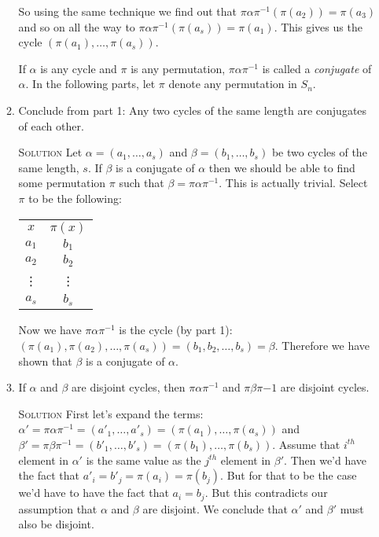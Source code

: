 \documentclass[twoside]{amsart}
\newcommand{\solution}{\textsc{Solution}\xspace}
\begin{document}
\begin{enumerate}[A.]
\begin{enumerate}[1]
       So using the same technique we find out that 
       $\pi \alpha \pi^{-1}(\pi(a_2))=\pi(a_3)$ and so on all the way
       to $\pi \alpha \pi^{-1}(\pi(a_s))=\pi(a_1)$. This gives us the cycle
       $(\pi(a_1),\dots,\pi(a_s))$.

\vspace{5pt}
       \noindent If $\alpha$ is any cycle and $\pi$ is any permutation,
       $\pi\alpha\pi^{-1}$ is called a \emph{conjugate} of $\alpha$. In
       the following parts, let $\pi$ denote any permutation in $S_n$.
\vspace{5pt}

       \item Conclude from part 1: Any two cycles of the same length are 
       conjugates of each other.

       \noindent \solution Let $\alpha=(a_1,\dots,a_s)$ and $\beta=
       (b_1,\dots,b_s)$ be two cycles of the same length, $s$. If $\beta$
       is a conjugate of $\alpha$ then we should be able to find some
       permutation $\pi$ such that $\beta=\pi \alpha \pi^{-1}$. This
       is actually trivial. Select $\pi$ to be the following:

       \begin{center}
       \begin{tabular}{cc}
           $x$ & $\pi(x)$ \\
           $a_1$ & $b_1$ \\
           $a_2$ & $b_2$ \\
           \vdots & \vdots \\
           $a_s$ & $b_s$ \\
       \end{tabular}
       \end{center}

       Now we have $\pi \alpha \pi^{-1}$ is the cycle (by part 1):
       $(\pi(a_1), \pi(a_2), \dots, \pi(a_s)) = (b_1, b_2, \dots, b_s) = 
       \beta$.
       Therefore we have shown that $\beta$ is a conjugate of $\alpha$.

       \item If $\alpha$ and $\beta$ are disjoint cycles, then
       $\pi\alpha\pi^{-1}$ and $\pi\beta\pi{-1}$ are disjoint cycles.

       \noindent \solution First let's expand the terms:
       $\alpha'=\pi\alpha\pi^{-1}=(a'_1,\dots,a'_s)=(\pi(a_1), \dots,
       \pi(a_s))$ and $\beta'=\pi\beta\pi^{-1}=(b'_1,\dots,b'_s)=(\pi(b_1),
       \dots, \pi(b_s))$.  Assume that $i^{th}$ element in $\alpha'$ is the
       same value as the $j^{th}$ element in $\beta'$. Then we'd have the fact
       that $a'_i=b'_j=\pi(a_i)=\pi(b_j)$. But for that to be the case we'd
       have to have the fact that $a_i=b_j$. But this contradicts our
       assumption that $\alpha$ and $\beta$ are disjoint. We conclude that
       $\alpha'$ and $\beta'$ must also be disjoint.


\end{enumerate}
\end{enumerate}
\end{document}
